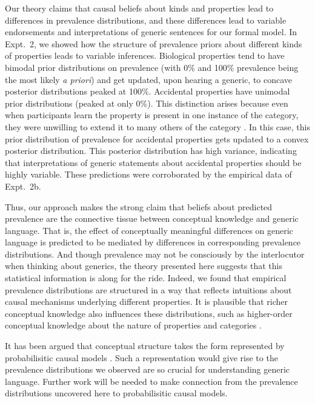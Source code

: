 \documentclass[12pt,letterpaper]{article}
\begin{document}
Our theory claims that causal beliefs about kinds and properties lead to differences in prevalence distributions, and these differences lead to variable endorsements and interpretations of generic sentences for our formal model. 
In Expt.~2, we showed how the structure of prevalence priors about different kinds of properties leads to variable inferences. 
Biological properties tend to have bimodal prior distributions on prevalence (with 0\% and 100\% prevalence being the most likely \emph{a priori}) and get updated, upon hearing a generic, to concave posterior distributions peaked at 100\%.
Accidental properties have unimodal prior distributions (peaked at only 0\%). 
This distinction arises because even when participants learn the property is present in one instance of the category, they were unwilling to extend it to many others of the category \cite{Goodman1955}. 
In this case, this prior distribution of prevalence for accidental properties gets updated to a convex posterior distribution.
This posterior distribution has high variance, indicating that interpretations of generic statements about accidental properties should be highly variable.
These predictions were corroborated by the empirical data of Expt.~2b. 

Thus, our approach makes the strong claim that beliefs about predicted prevalence are the connective tissue between conceptual knowledge and generic language.
That is, the effect of conceptually meaningful differences on generic language is predicted to be mediated by differences in corresponding prevalence distributions.
And though prevalence may not be consciously by the interlocutor when thinking about generics, the theory presented here suggests that this statistical information is along for the ride. 
Indeed, we found that empirical prevalence distributions are structured in a way that reflects intuitions about causal mechanisms underlying different properties.
It is plausible that richer conceptual knowledge also influences these distributions, such as higher-order conceptual knowledge about the nature of properties and categories \cite{Gelman2003,Keil1992}. 

It has been argued that conceptual structure takes the form represented by probabilisitic causal models \cite{pearl1988probabilistic, Gopnik2003theory, Goodmanconcepts}. 
Such a representation would give rise to the prevalence distributions we observed are so crucial for understanding generic language. 
Further work will be needed to make connection from the prevalence distributions uncovered here to probabilisitic causal models.
\end{document}
